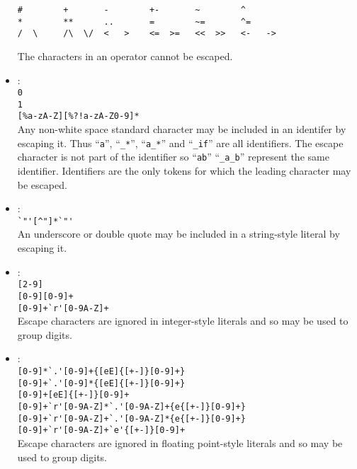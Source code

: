 \begin{itemize}
\begin{verbatim}
#        +       -        +-       ~        ^
*        **      ..       =        ~=       ^=   
/  \     /\  \/  <   >    <=  >=   <<  >>   <-   ->   
\end{verbatim}
The characters in an operator cannot be escaped.
%
\item {}:
\\
\verb'0'
\\
\verb'1'
\\
\verb'[%a-zA-Z][%?!a-zA-Z0-9]*'
\\
Any non-white space standard character may be included in an identifer
by escaping it.  
Thus ``\verb"a"'', ``\verb"_*"'', ``\verb"a_*"'' and ``\verb"_if"''
are all identifiers.
The escape character is not part of the identifier so ``\verb"ab"''
``\verb"_a_b"'' represent the same identifier.
Identifiers are the only tokens for which the leading character may be
escaped.
%
\item {}:
\\
\verb=`"'[^"]*`"'=
\\
An underscore or double quote may be included in a string-style literal
by escaping it.
%
\item {}:
\\
\verb=[2-9]=
\\
\verb=[0-9][0-9]+=
\\
\verb=[0-9]+`r'[0-9A-Z]+=
\\
Escape characters are ignored in integer-style literals and so may be used
to group digits.
\item {}:
\\
\verb=[0-9]*`.'[0-9]+{[eE]{[+-]}[0-9]+}=
\\
\verb=[0-9]+`.'[0-9]*{[eE]{[+-]}[0-9]+}=
\\
\verb=[0-9]+[eE]{[+-]}[0-9]+=
\\
\verb=[0-9]+`r'[0-9A-Z]*`.'[0-9A-Z]+{e{[+-]}[0-9]+}=
\\
\verb=[0-9]+`r'[0-9A-Z]+`.'[0-9A-Z]*{e{[+-]}[0-9]+}=
\\
\verb=[0-9]+`r'[0-9A-Z]+`e'{[+-]}[0-9]+=
\\
Escape characters are ignored in floating point-style literals
and so may be used to group digits.


\end{itemize}
